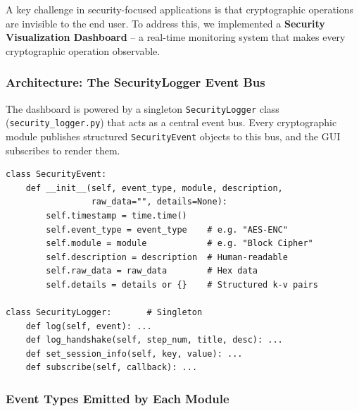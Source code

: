 \documentclass[12pt,a4paper]{article}
\begin{document}
A key challenge in security-focused applications is that cryptographic operations are invisible to the end user. To address this, we implemented a \textbf{Security Visualization Dashboard} -- a real-time monitoring system that makes every cryptographic operation observable.

\subsubsection{Architecture: The SecurityLogger Event Bus}

The dashboard is powered by a singleton \texttt{SecurityLogger} class (\texttt{security\_logger.py}) that acts as a central event bus. Every cryptographic module publishes structured \texttt{SecurityEvent} objects to this bus, and the GUI subscribes to render them.

\begin{lstlisting}[caption={SecurityLogger -- Event Bus (excerpt)}]
class SecurityEvent:
    def __init__(self, event_type, module, description,
                 raw_data="", details=None):
        self.timestamp = time.time()
        self.event_type = event_type    # e.g. "AES-ENC"
        self.module = module            # e.g. "Block Cipher"
        self.description = description  # Human-readable
        self.raw_data = raw_data        # Hex data
        self.details = details or {}    # Structured k-v pairs

class SecurityLogger:       # Singleton
    def log(self, event): ...
    def log_handshake(self, step_num, title, desc): ...
    def set_session_info(self, key, value): ...
    def subscribe(self, callback): ...
\end{lstlisting}

\subsubsection{Event Types Emitted by Each Module}
\end{document}
